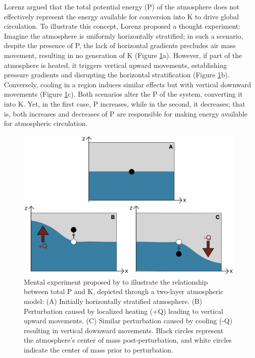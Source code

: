 Lorenz argued that the total potential energy (P) of the atmosphere does not effectively represent the energy available for conversion into K to drive global circulation. To illustrate this concept, Lorenz proposed a thought experiment: Imagine the atmosphere is uniformly horizontally stratified; in such a scenario, despite the presence of P, the lack of horizontal gradients precludes air mass movement, resulting in no generation of K (Figure \ref{energia_potencial}a). However, if part of the atmosphere is heated, it triggers vertical upward movements, establishing pressure gradients and disrupting the horizontal stratification (Figure \ref{energia_potencial}b). Conversely, cooling in a region induces similar effects but with vertical downward movements (Figure \ref{energia_potencial}c). Both scenarios alter the P of the system, converting it into K. Yet, in the first case, P increases, while in the second, it decreases; that is, both increases and decreases of P are responsible for making energy available for atmospheric circulation.

\begin{figure}[h]
\begin{center}
\setcaptionmargin{1cm}
\includegraphics[width=0.7 \columnwidth,angle=0]{fig/energia_potencial.png}
\caption[Effects of Heating and Cooling on Potential Energy]{Mental experiment proposed by \citet{lorenz1955} to illustrate the relationship between total P and K, depicted through a two-layer atmospheric model: (A) Initially horizontally stratified atmosphere. (B) Perturbation caused by localized heating (+Q) leading to vertical upward movements. (C) Similar perturbation caused by cooling (-Q) resulting in vertical downward movements. Black circles represent the atmosphere's center of mass post-perturbation, and white circles indicate the center of mass prior to perturbation.}
\label{energia_potencial}
\end{center}
\end{figure}

